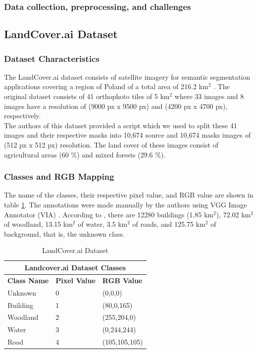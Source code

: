 \documentclass[conference]{IEEEtran}
\begin{document}
\subsubsection{Data collection, preprocessing, and challenges}


\subsection{LandCover.ai Dataset}



\subsubsection{Dataset Characteristics}
The LandCover.ai dataset consists of satellite imagery for semantic segmentation applications covering a region of Poland of a total area of 216.2 km$^2$ \cite{DBLP:journals/corr/abs-2005-02264}. The original dataset consists of 41 orthophoto tiles of 5 km$^2$ where 33 images and 8 images have a resolution of (9000 px x 9500 px) and (4200 px x 4700 px), respectively. \\ \indent
The authors of this dataset \cite{DBLP:journals/corr/abs-2005-02264} provided a script which we used to split these 41 images and their respective masks into 10,674 source and 10,674 masks images of (512 px x 512 px) resolution. The land cover of these images consist of agricultural areas (60 \%) and mixed forests (29.6 \%). \\ \indent



\subsubsection{Classes and RGB Mapping}
The name of the classes, their respective pixel value, and RGB value are shown in table \ref{landcover_ai_classes}. The annotations were made manually by the authors using VGG  Image Annotator (VIA) \cite{dutta2019vgg}. According to \cite{DBLP:journals/corr/abs-2005-02264}, there are 12280 buildings (1.85 km$^2$), 72.02 km$^2$ of woodland, 13.15 km$^2$ of water, 3.5 km$^2$ of roads, and 125.75 km$^2$ of background, that is, the unknown class. \\

\begin{table}[htbp]
\centering
\caption{LandCover.ai Dataset}
\begin{tabular}{|p{1.2cm}|p{0.7cm}|p{1.6cm}|}
 \hline
 \multicolumn{3}{|c|}{\textbf{Landcover.ai Dataset Classes}} \\
 \hline
 \textbf{Class Name} & \textbf{Pixel Value}& \textbf{RGB Value} \\
 \hline
 Unknown & 0  & (0,0,0)\\ 
 \hline
 Building & 1  & (80,0,165)\\ 
 \hline
 Woodland & 2  & (255,204,0)\\ 
 \hline
 Water & 3  & (0,244,244)\\ 
 \hline
 Road & 4  & (105,105,105)\\ 
 \hline
\end{tabular}
\label{landcover_ai_classes}
\end{table}
\\
\end{document}
